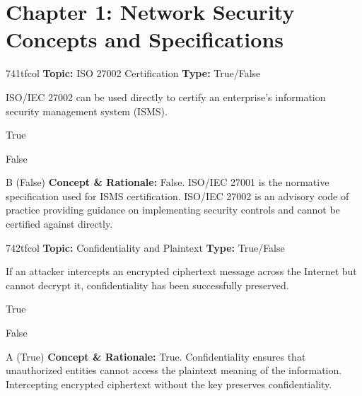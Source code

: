 \section{Chapter 1: Network Security Concepts and Specifications}

\begin{qcard}{741}{tfcol}
\textcolor{darkslate!75}{\small\textbf{Topic:} ISO 27002 Certification \hfill \textbf{Type:} True/False}\vspace{0.4em}\par
ISO/IEC 27002 can be used directly to certify an enterprise's information security management system (ISMS).
\begin{qoptions}
\item True
\item False
\end{qoptions}
\end{qcard}
\nopagebreak
\begin{explainbox}{B (False)}
\textbf{Concept \& Rationale:} False. ISO/IEC 27001 is the normative specification used for ISMS certification. ISO/IEC 27002 is an advisory code of practice providing guidance on implementing security controls and cannot be certified against directly.
\end{explainbox}

\begin{qcard}{742}{tfcol}
\textcolor{darkslate!75}{\small\textbf{Topic:} Confidentiality and Plaintext \hfill \textbf{Type:} True/False}\vspace{0.4em}\par
If an attacker intercepts an encrypted ciphertext message across the Internet but cannot decrypt it, confidentiality has been successfully preserved.
\begin{qoptions}
\item True
\item False
\end{qoptions}
\end{qcard}
\nopagebreak
\begin{explainbox}{A (True)}
\textbf{Concept \& Rationale:} True. Confidentiality ensures that unauthorized entities cannot access the plaintext meaning of the information. Intercepting encrypted ciphertext without the key preserves confidentiality.
\end{explainbox}

